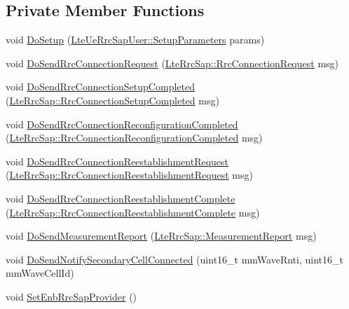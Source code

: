 \subsection*{Private Member Functions}
\begin{DoxyCompactItemize}
\item 
void \hyperlink{classns3_1_1LteUeRrcProtocolIdeal_a9cb8f70fbdd5ae1591c1170e7e5a89fa}{Do\+Setup} (\hyperlink{structns3_1_1LteUeRrcSapUser_1_1SetupParameters}{Lte\+Ue\+Rrc\+Sap\+User\+::\+Setup\+Parameters} params)
\item 
void \hyperlink{classns3_1_1LteUeRrcProtocolIdeal_aba69a27c58dff7088f0b9e84da9c830c}{Do\+Send\+Rrc\+Connection\+Request} (\hyperlink{structns3_1_1LteRrcSap_1_1RrcConnectionRequest}{Lte\+Rrc\+Sap\+::\+Rrc\+Connection\+Request} msg)
\item 
void \hyperlink{classns3_1_1LteUeRrcProtocolIdeal_a0c14aa7ed59d2d0ef7155f7c1edfeaab}{Do\+Send\+Rrc\+Connection\+Setup\+Completed} (\hyperlink{structns3_1_1LteRrcSap_1_1RrcConnectionSetupCompleted}{Lte\+Rrc\+Sap\+::\+Rrc\+Connection\+Setup\+Completed} msg)
\item 
void \hyperlink{classns3_1_1LteUeRrcProtocolIdeal_a7a67d7e0ca99d8085900dd73cbc694b6}{Do\+Send\+Rrc\+Connection\+Reconfiguration\+Completed} (\hyperlink{structns3_1_1LteRrcSap_1_1RrcConnectionReconfigurationCompleted}{Lte\+Rrc\+Sap\+::\+Rrc\+Connection\+Reconfiguration\+Completed} msg)
\item 
void \hyperlink{classns3_1_1LteUeRrcProtocolIdeal_a79ce628961d560d24c8a1a39c0a898d8}{Do\+Send\+Rrc\+Connection\+Reestablishment\+Request} (\hyperlink{structns3_1_1LteRrcSap_1_1RrcConnectionReestablishmentRequest}{Lte\+Rrc\+Sap\+::\+Rrc\+Connection\+Reestablishment\+Request} msg)
\item 
void \hyperlink{classns3_1_1LteUeRrcProtocolIdeal_a8b9cbe10011141c78dbabbfcf844ce3f}{Do\+Send\+Rrc\+Connection\+Reestablishment\+Complete} (\hyperlink{structns3_1_1LteRrcSap_1_1RrcConnectionReestablishmentComplete}{Lte\+Rrc\+Sap\+::\+Rrc\+Connection\+Reestablishment\+Complete} msg)
\item 
void \hyperlink{classns3_1_1LteUeRrcProtocolIdeal_a145c61e1111a13c5239f5846823ee322}{Do\+Send\+Measurement\+Report} (\hyperlink{structns3_1_1LteRrcSap_1_1MeasurementReport}{Lte\+Rrc\+Sap\+::\+Measurement\+Report} msg)
\item 
void \hyperlink{classns3_1_1LteUeRrcProtocolIdeal_a6832f7a11efd6994441fcfea20f2b3f0}{Do\+Send\+Notify\+Secondary\+Cell\+Connected} (uint16\+\_\+t mm\+Wave\+Rnti, uint16\+\_\+t mm\+Wave\+Cell\+Id)
\item 
void \hyperlink{classns3_1_1LteUeRrcProtocolIdeal_a86373f892a016ce3ea48859450e5bdd9}{Set\+Enb\+Rrc\+Sap\+Provider} ()
\end{DoxyCompactItemize}
